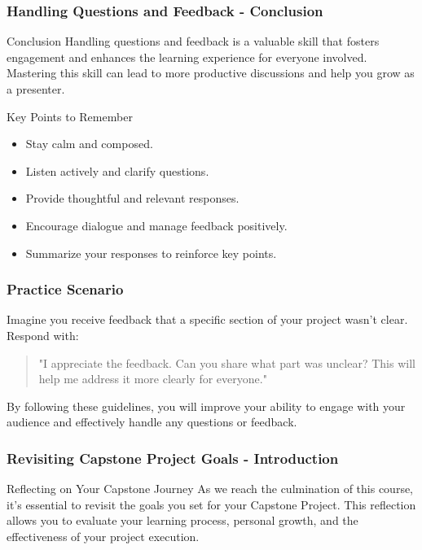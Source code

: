 \documentclass[aspectratio=169]{beamer}
\begin{document}
\begin{frame}[fragile]
    \frametitle{Handling Questions and Feedback - Conclusion}
    \begin{block}{Conclusion}
        Handling questions and feedback is a valuable skill that fosters engagement and enhances the learning experience for everyone involved. 
        Mastering this skill can lead to more productive discussions and help you grow as a presenter.
    \end{block}

    \begin{block}{Key Points to Remember}
        \begin{itemize}
            \item Stay calm and composed.
            \item Listen actively and clarify questions.
            \item Provide thoughtful and relevant responses.
            \item Encourage dialogue and manage feedback positively.
            \item Summarize your responses to reinforce key points.
        \end{itemize}
    \end{block}
\end{frame}

\begin{frame}[fragile]
    \frametitle{Practice Scenario}
    Imagine you receive feedback that a specific section of your project wasn’t clear. Respond with:
    \begin{quote}
        "I appreciate the feedback. Can you share what part was unclear? This will help me address it more clearly for everyone."
    \end{quote}
    
    By following these guidelines, you will improve your ability to engage with your audience and effectively handle any questions or feedback.
\end{frame}

\begin{frame}[fragile]
    \frametitle{Revisiting Capstone Project Goals - Introduction}
    \begin{block}{Reflecting on Your Capstone Journey}
        As we reach the culmination of this course, it's essential to revisit the goals you set for your Capstone Project. This reflection allows you to evaluate your learning process, personal growth, and the effectiveness of your project execution.
    \end{block}
\end{frame}
\end{document}
